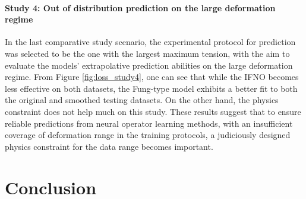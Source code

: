 \documentclass[twocolumn,10pt]{asme2ej}
\renewcommand{\~}{\tilde}
\renewcommand{\-}{\bar}
\newcommand{\8}{\infty}
\numberwithin{equation}{section}
\newcommand{\YY}[1]{{\color{red}#1}}
\begin{document}
\begin{figure*}[h!]
\caption{Error comparisons of different models -- Study 4: {\it out-of-distribution} prediction on the {\it large} deformation regime. {\it Left}: relative errors for displacement field prediction on the training and test datasets. We highlight the model with the best prediction accuracy in bold. {\it Right}: sample-wise error comparison on all test sets from the original (unsmoothed) dataset.}%
    \label{fig:loss_study4}
\end{figure*}

\paragraph{Study 4: Out of distribution prediction on the large deformation regime} In the last comparative study scenario, the experimental protocol for prediction was selected to be the one with the largest maximum tension, with the aim to evaluate the models' extrapolative prediction abilities on the large deformation regime. From Figure \ref{fig:loss_study4}, one can see that while the IFNO becomes less effective on both datasets, the Fung-type model exhibits a better fit to both the original and smoothed testing datasets. On the other hand, the physics constraint does not help much on this study. These results suggest that to ensure reliable predictions from neural operator learning methods, with an insufficient coverage of deformation range in the training protocols, a judiciously designed physics constraint for the data range becomes important.




\section{Conclusion}\label{sec:conclusion}
\end{document}

